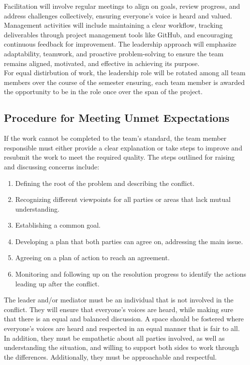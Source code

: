 \documentclass[titlepage]{article}
\begin{document}
Facilitation will involve regular meetings to align
on goals, review progress, and address challenges collectively,
ensuring everyone’s voice is heard and valued. Management activities
will include maintaining a clear workflow, tracking deliverables
through project management tools like GitHub, and encouraging
continuous feedback for improvement. The leadership approach will
emphasize adaptability, teamwork, and proactive problem-solving to
ensure the team remains aligned, motivated, and effective in
achieving its purpose.\\

For equal distirbution of work, the leadership role will be rotated among
all team members over the course of the semester ensuring, each team member is 
awarded the opportunity to be in the role once over the span of the project.

\subsection{Procedure for Meeting Unmet Expectations}
If the work cannot be completed to the team’s standard, the team
member responsible
must either provide a clear explanation or take steps to improve and
resubmit the work to
meet the required quality.
The steps outlined for raising and discussing concerns include:
\begin{enumerate}
  \item Defining the root of the problem and describing the conflict.
  \item Recognizing different viewpoints for all parties or areas
    that lack mutual understanding.
  \item Establishing a common goal.
  \item Developing a plan that both parties can agree on, addressing
    the main issue.
  \item Agreeing on a plan of action to reach an agreement.
  \item Monitoring and following up on the resolution
    progress to identify the actions leading up after the conflict.
\end{enumerate}

The leader and/or mediator must be an individual that is not involved
in the conflict. They will ensure that everyone’s voices are heard,
while making sure
that there is an equal
and balanced discussion. A space should be fostered where everyone’s
voices are heard and
respected in an equal manner that is fair to all. In addition, they
must be empathetic about
all parties involved, as well as understanding the situation, and
willing to support both
sides to work through the differences. Additionally, they must be
approachable and
respectful.
\\
\end{document}
